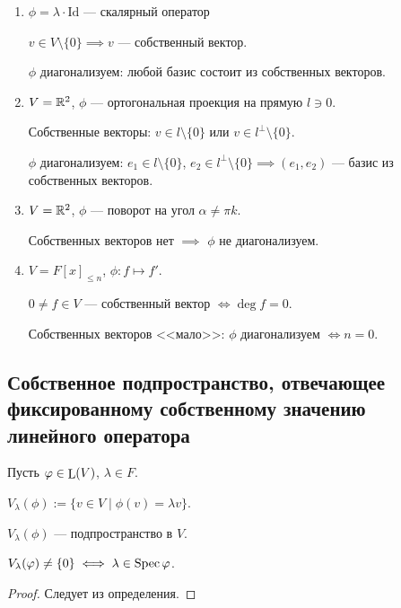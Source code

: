 \begin{enumerate}
    \item $\phi = \lambda \cdot \mathrm{Id}$ --- скалярный оператор

        $v \in V \setminus \{0\} \implies v$ --- собственный вектор.

        {\color{red} $\phi$ диагонализуем}: любой базис состоит из собственных векторов.

    \item $V = \mathbb{R}^2$, $\phi$ --- ортогональная проекция на прямую $l \ni 0$.

        Собственные векторы: $v \in l \setminus \{0\}$ или $v \in l^{\perp} \setminus \{0\}$.

        {\color{red} $\phi$ диагонализуем}: $e_1 \in l \setminus \{0\}$, $e_2 \in l^{\perp} \setminus \{0\} \implies (e_1, e_2)$ --- базис из собственных векторов.

    \item $V = \mathbb{R}^2$, $\phi$ --- поворот на угол $\alpha \neq \pi k$.

        Собственных векторов нет $\implies$ {\color{red} $\phi$ не диагонализуем}.

    \item $V = F[x]_{\leq n}$, $\phi \colon f \mapsto f'$.

        $0 \neq f \in V$ --- собственный вектор $\iff \deg f = 0$.

        Собственных векторов {\color{blue} <<мало>>}: {\color{red} $\phi$ диагонализуем $\iff n = 0$}.
\end{enumerate}


\subsection{Собственное подпространство, отвечающее фиксированному собственному значению линейного оператора}

Пусть $\varphi \in \operatorname{\mathop{\mathrm{L}}}(V)$, $\lambda \in F$.

$V_\lambda(\phi) := \{v \in V \mid \phi(v) = \lambda v\}$.

\begin{exercise}
    $V_\lambda(\phi)$ --- подпространство в $V$.
\end{exercise}

\begin{lemma}
    $V_\lambda(\varphi) \neq \{0\} \iff \lambda \in \operatorname{\mathop{\mathrm{Spec}}} \varphi$.
\end{lemma}

\begin{proof}
    Следует из определения.
\end{proof}

